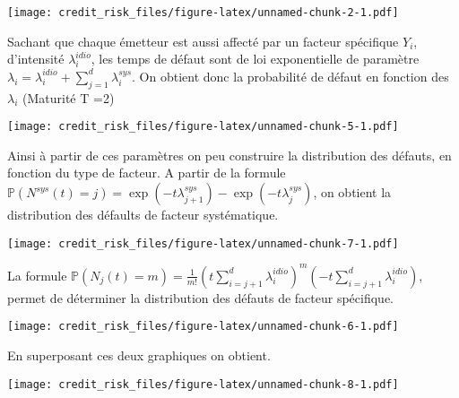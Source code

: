 \documentclass[10pt,a4paper]{article}
\begin{document}
	\texttt{[image: credit\_risk\_files/figure-latex/unnamed-chunk-2-1.pdf]}
	
	Sachant que chaque émetteur est aussi affecté par un facteur spécifique $ Y_i $, d'intensité $ \lambda_i^{idio} $, les temps de défaut sont de loi exponentielle de paramètre $ \lambda_i = \lambda_i^{idio} + \sum_{j=1}^d \lambda_i^{sys} $. On obtient donc la probabilité de défaut en fonction des $ \lambda_i $ (Maturité T =2)
	
	\texttt{[image: credit\_risk\_files/figure-latex/unnamed-chunk-5-1.pdf]}
	
	Ainsi à partir de ces paramètres on peu construire la distribution des défauts, en fonction du type de facteur. A partir de la formule $ \mathbb{P}(N^{sys}(t)=j) = \exp(-t\lambda_{j+1}^{sys}) - \exp(-t\lambda_{j}^{sys} ) $, on obtient la distribution des défaults de facteur systématique.
	
	\texttt{[image: credit\_risk\_files/figure-latex/unnamed-chunk-7-1.pdf]}
	
	La formule $ \mathbb{P}(N_j(t)=m) = \frac{1}{m!}\left(t \sum_{i=j+1}^d \lambda_i^{idio}\right)^m \left(-t \sum_{i=j+1}^d \lambda_i^{idio}\right)  $, permet de déterminer la distribution des défauts de facteur spécifique.
	
	\texttt{[image: credit\_risk\_files/figure-latex/unnamed-chunk-6-1.pdf]}
	
	En superposant ces deux graphiques on obtient.
	
	\texttt{[image: credit\_risk\_files/figure-latex/unnamed-chunk-8-1.pdf]}
	
	
\end{document}
